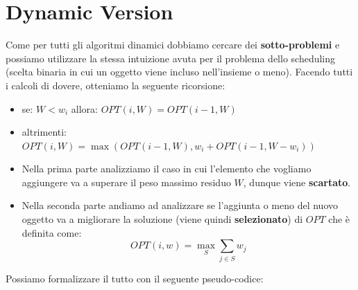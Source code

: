 \section{Dynamic Version}

Come per tutti gli algoritmi dinamici dobbiamo cercare dei
\textbf{sotto-problemi} e possiamo utilizzare la stessa intuizione avuta
per il problema dello scheduling (scelta binaria in cui un oggetto viene
incluso nell'insieme o meno). Facendo tutti i calcoli di dovere,
otteniamo la seguente ricorsione:
\begin{myblockquote}
  \begin{itemize}
    \item se: $W < w_i$ allora: 
          $OPT(i, W) = OPT(i-1,W)$
    \item altrimenti: 
          $OPT(i, W) = \max(OPT(i-1, W), w_i + OPT(i-1, W-w_i))$
  \end{itemize}
\end{myblockquote}

\begin{itemize}

  \item
        Nella prima parte analizziamo il caso in cui l'elemento che vogliamo
        aggiungere va a superare il peso massimo residuo $W$, dunque viene
        \textbf{scartato}.
  \item
        Nella seconda parte andiamo ad analizzare se l'aggiunta o meno del
        nuovo oggetto va a migliorare la soluzione (viene quindi
        \textbf{selezionato}) di $OPT$ che è definita come:
        $$
          OPT(i, w) = \max_{S} \sum_{j \in S} w_j
        $$
\end{itemize}

Possiamo formalizzare il tutto con il seguente pseudo-codice:


